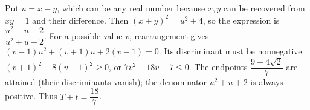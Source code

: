 Put $u=x-y$, which can be any real number because $x,y$ can be recovered from $xy=1$ and their difference. Then $(x+y)^2=u^2+4$, so the expression is $\dfrac{u^2-u+2}{u^2+u+2}$. For a possible value $v$, rearrangement gives $(v-1)u^2+(v+1)u+2(v-1)=0$. Its discriminant must be nonnegative: $(v+1)^2-8(v-1)^2\ge0$, or $7v^2-18v+7\le0$. The endpoints $\dfrac{9\pm4\sqrt2}{7}$ are attained (their discriminants vanish); the denominator $u^2+u+2$ is always positive. Thus $\boxed{T+t=\dfrac{18}{7}}$.
